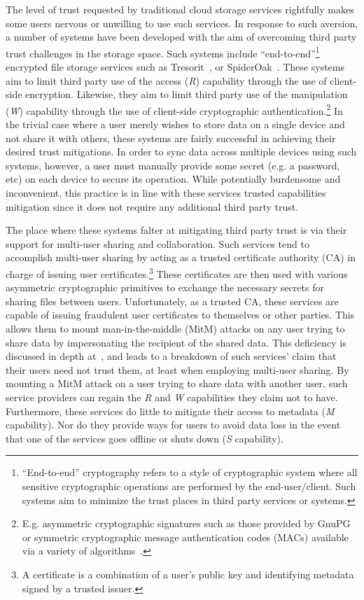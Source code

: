 The level of trust requested by traditional cloud storage services
rightfully makes some users nervous or unwilling to use such
services. In response to such aversion, a number of systems have been
developed with the aim of overcoming third party trust challenges in
the storage space. Such systems include
``end-to-end''\footnote{``End-to-end'' cryptography refers to a style
  of cryptographic system where all sensitive cryptographic operations
  are performed by the end-user/client. Such systems aim to minimize
  the trust places in third party services or systems.} encrypted file
storage services such as Tresorit~\cite{tresorit}, or
SpiderOak~\cite{spideroak}. These systems aim to limit third party use
of the access (\emph{R}) capability through the use of client-side
encryption. Likewise, they aim to limit third party use of the
manipulation (\emph{W}) capability through the use of client-side
cryptographic authentication.\footnote{E.g. asymmetric cryptographic
  signatures such as those provided by GnuPG~\cite{gnupg} or symmetric
  cryptographic message authentication codes (MACs) available via a
  variety of algorithms~\cite{dworkin2005, dworkin2008, dworkin2007}.}
In the trivial case where a user merely wishes to store data on a
single device and not share it with others, these systems are fairly
successful in achieving their desired trust mitigations. In order to
sync data across multiple devices using such systems, however, a user
must manually provide some secret (e.g. a password, etc) on each
device to secure its operation. While potentially burdensome and
inconvenient, this practice is in line with these services trusted
capabilities mitigation since it does not require any additional third
party trust.

The place where these systems falter at mitigating third party trust
is via their support for multi-user sharing and collaboration. Such
services tend to accomplish multi-user sharing by acting as a trusted
certificate authority (CA) in charge of issuing user
certificates.\footnote{A certificate is a combination of a user's
  public key and identifying metadata signed by a trusted issuer.}
These certificates are then used with various asymmetric cryptographic
primitives to exchange the necessary secrets for sharing files between
users. Unfortunately, as a trusted CA, these services are capable of
issuing fraudulent user certificates to themselves or other
parties. This allows them to mount man-in-the-middle (MitM) attacks on
any user trying to share data by impersonating the recipient of the
shared data. This deficiency is discussed in depth
at~\cite{wilson2014}, and leads to a breakdown of such services' claim
that their users need not trust them, at least when employing
multi-user sharing. By mounting a MitM attack on a user trying to
share data with another user, such service providers can regain the
\emph{R} and \emph{W} capabilities they claim not to
have. Furthermore, these services do little to mitigate their access
to metadata (\emph{M} capability). Nor do they provide ways for users
to avoid data loss in the event that one of the services goes offline
or shuts down (\emph{S} capability).

